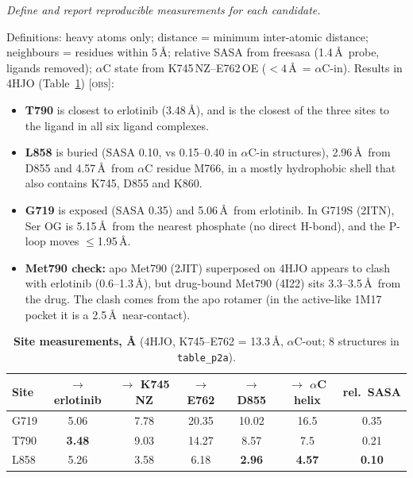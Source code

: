 \documentclass{cisXXX} %
\newcommand{\obs}{\textnormal{\textsc{[obs]}}}
\newcommand{\code}[1]{\texttt{\small #1}}
\newcommand{\q}[1]{\textit{#1}\par\smallskip\noindent}
\begin{document}
\label{p2}
\q{Define and report reproducible measurements for each candidate.}
Definitions: heavy atoms only; distance = minimum inter-atomic distance; neighbours = residues within 5\,\AA; relative SASA from freesasa (1.4\,\AA\ probe, ligands removed); $\alpha$C state from K745\,NZ--E762\,OE ($<4$\,\AA\ = $\alpha$C-in). Results in 4HJO (Table~\ref{tab:meas}) \obs:
\begin{itemize}
\item \textbf{T790} is closest to erlotinib (3.48\,\AA), and is the closest of the three sites to the ligand in all six ligand complexes.
\item \textbf{L858} is buried (SASA 0.10, vs 0.15--0.40 in $\alpha$C-in structures), 2.96\,\AA\ from D855 and 4.57\,\AA\ from $\alpha$C residue M766, in a mostly hydrophobic shell that also contains K745, D855 and K860.
\item \textbf{G719} is exposed (SASA 0.35) and 5.06\,\AA\ from erlotinib. In G719S (2ITN), Ser OG is 5.15\,\AA\ from the nearest phosphate (no direct H-bond), and the P-loop moves $\le$1.95\,\AA.
\item \textbf{Met790 check:} apo Met790 (2JIT) superposed on 4HJO appears to clash with erlotinib (0.6--1.3\,\AA), but drug-bound Met790 (4I22) sits 3.3--3.5\,\AA\ from the drug. The clash comes from the apo rotamer (in the active-like 1M17 pocket it is a 2.5\,\AA\ near-contact).
\end{itemize}

\begin{table}[H]
\centering\small
\caption{\textbf{Site measurements, \AA} (4HJO, K745--E762 = 13.3\,\AA, $\alpha$C-out; 8 structures in \code{table\_p2a}).}
\label{tab:meas}
\begin{tabular}{@{}l c c c c c c@{}}
\toprule
Site & $\to$ erlotinib & $\to$ K745 NZ & $\to$ E762 & $\to$ D855 & $\to$ $\alpha$C helix & rel.\ SASA \\
\midrule
G719 & 5.06 & 7.78 & 20.35 & 10.02 & 16.5 & 0.35 \\
T790 & \textbf{3.48} & 9.03 & 14.27 & 8.57 & 7.5 & 0.21 \\
L858 & 5.26 & 3.58 & 6.18 & \textbf{2.96} & \textbf{4.57} & \textbf{0.10} \\
\bottomrule
\end{tabular}
\end{table}
\end{document}

